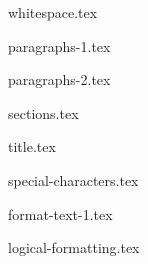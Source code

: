 \documentclass[allauthors]{../../cursuspresentatie}
\def\importslide#1#2{%
	{#2}
}
\begin{document}


\importslide{beginners_NL}{whitespace.tex}


\importslide{beginners_NL}{paragraphs-1.tex}

\importslide{beginners_NL}{paragraphs-2.tex}


\importslide{beginners_NL}{sections.tex}


\importslide{beginners_NL}{title.tex}


\importslide{beginners_NL}{special-characters.tex}


\importslide{beginners_NL}{format-text-1.tex}

\importslide{beginners_NL}{logical-formatting.tex}


\end{document}
